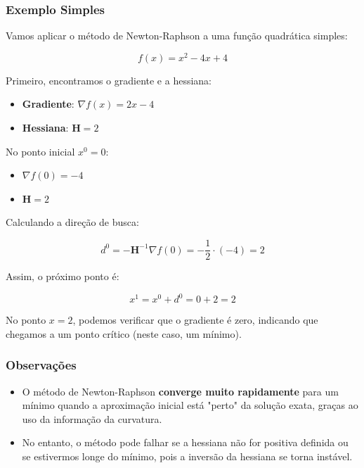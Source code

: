 \documentclass[a4paper, 12pt]{article}
\begin{document}
\subsubsection*{Exemplo Simples}

Vamos aplicar o método de Newton-Raphson a uma função quadrática simples:

\begin{equation}
    f(x) = x^2 - 4x + 4
\end{equation}

Primeiro, encontramos o gradiente e a hessiana:
\begin{itemize}
    \item \textbf{Gradiente}: $\nabla f(x) = 2x - 4$
    \item \textbf{Hessiana}: $\mathbf{H} = 2$
\end{itemize}

No ponto inicial $x^0 = 0$:
\begin{itemize}
    \item $\nabla f(0) = -4$
    \item $\mathbf{H} = 2$
\end{itemize}

Calculando a direção de busca:

\begin{equation}
    d^0 = -\mathbf{H}^{-1} \nabla f(0) = -\frac{1}{2} \cdot (-4) = 2
\end{equation}

Assim, o próximo ponto é:

\begin{equation}
    x^1 = x^0 + d^0 = 0 + 2 = 2
\end{equation}

No ponto $x = 2$, podemos verificar que o gradiente é zero, indicando que chegamos a um ponto crítico (neste caso, um mínimo).

\subsubsection*{Observações}

\begin{itemize}
    \item O método de Newton-Raphson \textbf{converge muito rapidamente} para um mínimo quando a aproximação inicial está "perto" da solução exata, graças ao uso da informação da curvatura.
    \item No entanto, o método pode falhar se a hessiana não for positiva definida ou se estivermos longe do mínimo, pois a inversão da hessiana se torna instável.
\end{itemize}
\end{document}

